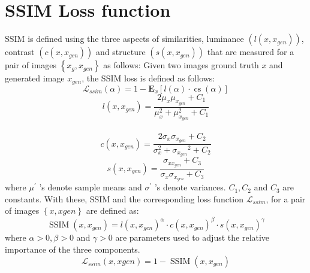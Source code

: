\section{SSIM Loss function}
SSIM \cite{wang2004image} is defined using the three aspects of similarities, luminance $\left(l\left(x, x_{g e n}\right)\right)$, contrast $\left(c\left(x, x_{g e n}\right)\right)$ and structure $\left(s\left(x, x_{g e n}\right)\right)$ that are measured for a pair of images $\left\{x_{g}, x_{g e n}\right\}$ as follows: Given two images ground truth $x$ and generated image $x_{gen}$, the SSIM \cite{wang2004image} loss is defined as follows:
$$
\mathcal{L}_{ssim}(\alpha)=1-\mathbf{E}_{x}[l(\alpha) \cdot \operatorname{cs}(\alpha)]
$$
$$l\left(x, x_{g e n}\right)=\frac{2 \mu_{x} \mu_{x_{g e n}}+C_{1}}{\mu_{x}^{2}+\mu_{x_{g e n}}^{2}+C_{1}}$$\\
$$c\left(x, x_{g e n}\right)=\frac{2 \sigma_{x} \sigma_{x_{g e n}}+C_{2}}{\sigma_{x}^{2}+\sigma_{x_{g e n}}{ }^{2}+C_{2}}$$
$$s\left(x, x_{g e n}\right)=\frac{\sigma_{x x_{g c n}}+C_{3}}{\sigma_{x} \sigma_{x_{g e n}}+C_{3}}$$
where $\mu^{\prime}$ 's denote sample means and $\sigma^{\prime}$ 's denote variances. $C_{1}, C_{2}$ and $C_{3}$ are constants. With these, SSIM and the corresponding loss function $\mathcal{L}_{ssim}$, for a pair of images $\left\{x, x{gen}\right\}$ are defined as:
$$
\operatorname{SSIM}\left(x, x_{gen}\right)=l\left(x, x_{g e n}\right)^{\alpha} \cdot c\left(x, x_{g e n}\right)^{\beta} \cdot s\left(x, x_{g e n}\right)^{\gamma}
$$
where $\alpha>0, \beta>0$ and $\gamma>0$ are parameters used to adjust the relative importance of the three components.
$$
\mathcal{L}_{ssim}\left(x, x{g e n}\right)=1-\operatorname{SSIM}\left(x, x_{g e n}\right)
$$

